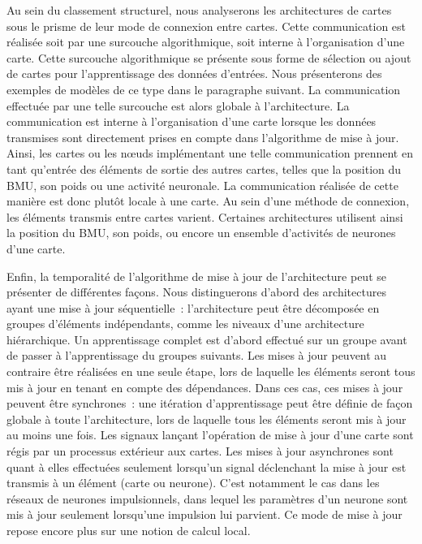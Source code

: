 \documentclass[../main]{subfiles}
\begin{document}
Au sein du classement structurel, nous analyserons les architectures de cartes sous le prisme de leur mode de connexion entre cartes. Cette communication est réalisée soit par une surcouche algorithmique, soit interne à l'organisation d'une carte.
Cette surcouche algorithmique se présente sous forme de sélection ou ajout de cartes pour l'apprentissage des données d'entrées. Nous présenterons des exemples de modèles de ce type dans le paragraphe suivant. La communication effectuée par une telle surcouche est alors globale à l'architecture.
La communication est interne à l'organisation d'une carte lorsque les données transmises sont directement prises en compte dans l'algorithme de mise à jour. Ainsi, les cartes ou les n\oe{}uds implémentant une telle communication prennent en tant qu'entrée des éléments de sortie des autres cartes, telles que la position du BMU, son poids ou une activité neuronale. La communication réalisée de cette manière est donc plutôt locale à une carte.
Au sein d'une méthode de connexion, les éléments transmis entre cartes varient. Certaines architectures utilisent ainsi la position du BMU, son poids, ou encore un ensemble d'activités de neurones d'une carte.


Enfin, la temporalité de l'algorithme de mise à jour de l'architecture peut se présenter de différentes façons. Nous distinguerons d'abord des architectures ayant une mise à jour séquentielle~: l'architecture peut être décomposée en groupes d'éléments indépendants, comme les niveaux d'une architecture hiérarchique. 
Un apprentissage complet est d'abord effectué sur un groupe avant de passer à l'apprentissage du groupes suivants. 
Les mises à jour peuvent au contraire être réalisées en une seule étape, lors de laquelle les éléments seront tous mis à jour en tenant en compte des dépendances. Dans ces cas, ces mises à jour peuvent être synchrones~: une itération d'apprentissage peut être définie de façon globale à toute l'architecture, lors de laquelle tous les éléments seront mis à jour au moins une fois. Les signaux lançant l'opération de mise à jour d'une carte sont régis par un processus extérieur aux cartes.
Les mises à jour asynchrones sont quant à elles effectuées seulement lorsqu'un signal déclenchant la mise à jour est transmis à un élément (carte ou neurone). C'est notamment le cas dans les réseaux de neurones impulsionnels, dans lequel les paramètres d'un neurone sont mis à jour seulement lorsqu'une impulsion lui parvient. Ce mode de mise à jour repose encore plus sur une notion de calcul local.
\end{document}
